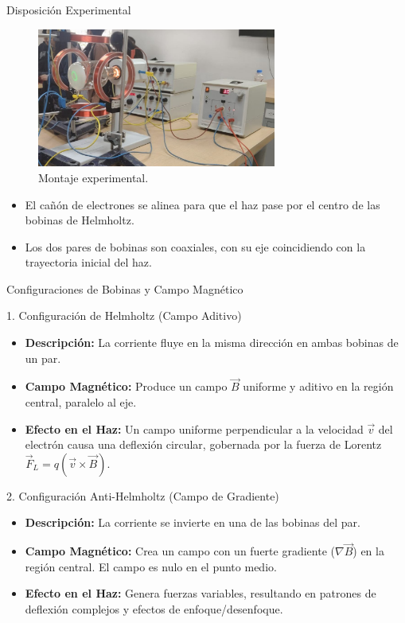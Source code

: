 \documentclass{beamer}
\begin{document}
\begin{frame}{Disposición Experimental}
  \begin{figure}
    \centering
    \includegraphics[width=0.7\textwidth]{../Figures/Montaje.jpeg}
    \caption{Montaje experimental.}
  \end{figure}
  \begin{itemize}
    \item El cañón de electrones se alinea para que el haz pase por el centro de las bobinas de Helmholtz.
    \item Los dos pares de bobinas son coaxiales, con su eje coincidiendo con la trayectoria inicial del haz.
  \end{itemize}
\end{frame}

\begin{frame}{Configuraciones de Bobinas y Campo Magnético}
  \begin{block}{1. Configuración de Helmholtz (Campo Aditivo)}
    \begin{itemize}
      \item \textbf{Descripción:} La corriente fluye en la misma dirección en ambas bobinas de un par.
      \item \textbf{Campo Magnético:} Produce un campo $\vec{B}$ uniforme y aditivo en la región central, paralelo al eje.
      \item \textbf{Efecto en el Haz:} Un campo uniforme perpendicular a la velocidad $\vec{v}$ del electrón causa una deflexión circular, gobernada por la fuerza de Lorentz $\vec{F}_L = q(\vec{v} \times \vec{B})$.
    \end{itemize}
  \end{block}
\end{frame}
\begin{frame}
  \begin{block}{2. Configuración Anti-Helmholtz (Campo de Gradiente)}
    \begin{itemize}
      \item \textbf{Descripción:} La corriente se invierte en una de las bobinas del par.
      \item \textbf{Campo Magnético:} Crea un campo con un fuerte gradiente ($\nabla \vec{B}$) en la región central. El campo es nulo en el punto medio.
      \item \textbf{Efecto en el Haz:} Genera fuerzas variables, resultando en patrones de deflexión complejos y efectos de enfoque/desenfoque.
    \end{itemize}
  \end{block}
\end{frame}
\end{document}
